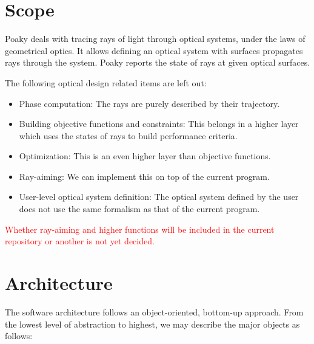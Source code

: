 \section{Scope}
Poaky deals with tracing rays of light through optical systems,
under the laws of geometrical optics. It allows defining an optical system
with surfaces propagates rays through the system. Poaky reports the
state of rays at given optical surfaces.

The following optical design related items are left out:
\begin{itemize}
\item Phase computation: The rays are purely described by their trajectory.
\item Building objective functions and constraints: This belongs in a higher
layer which uses the states of rays to build performance criteria.
\item Optimization: This is an even higher layer than objective functions.
\item Ray-aiming: We can implement this on top of the current program.
\item User-level optical system definition: The optical system defined
      by the user does not use the same formalism as that of the current
      program.
\end{itemize}

\textcolor{red}{Whether ray-aiming and higher functions will be included
in the current repository or another is not yet decided.}

\section{Architecture}
The software architecture follows an object-oriented, bottom-up approach.
From the lowest level of abstraction to highest, we may describe the
major objects as follows:

